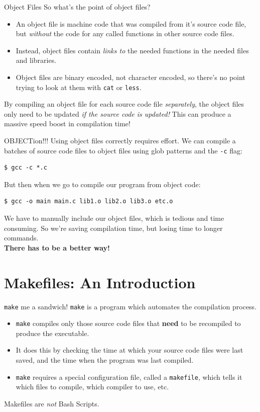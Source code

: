 \documentclass[11pt]{beamer}
\begin{document}
\begin{frame}{Object Files}
So what's the point of object files? 
\begin{itemize}
\item An object file is machine code that was compiled from it's source code file, but \emph{without} the code for any called functions in other source code files. 
\item Instead, object files contain \emph{links to} the needed functions in the needed files and libraries.   
\item Object files are binary encoded, not character encoded, so there's no point trying to look at them with \texttt{cat} or \texttt{less}.  
\end{itemize}
By compiling an object file for each source code file \emph{separately}, the object files only need to be updated \emph{if the source code is updated!}  This can produce a massive speed boost in compilation time!  \\
\end{frame}

\begin{frame}[fragile=singleslide]{OBJECTion!!!}
Using object files correctly requires effort.  We can compile a batches of source code files to object files using glob patterns and the \texttt{-c} flag:
\begin{lstlisting}[style=terminal]
$ gcc -c *.c
\end{lstlisting}
But then when we go to compile our program from object code:
\begin{lstlisting}[style=terminal]
$ gcc -o main main.c lib1.o lib2.o lib3.o etc.o 
\end{lstlisting}
We have to manually include our object files, which is tedious and time consuming. So we're saving compilation time, but losing time to longer commands.\\ 
\vspace{1em}
\center
\textbf{There has to be a better way!} \\
\end{frame}

\section[Makefiles]{Makefiles: An Introduction}
\begin{frame}{\texttt{make} me a sandwich!}
\texttt{make} is a program which automates the compilation process.
\begin{itemize}
\item \texttt{make} compiles only those source code files that \textbf{need} to be recompiled to produce the executable.
\item It does this by checking the time at which your source code files were last saved, and the time when the program was last compiled.
\item \texttt{make} requires a special configuration file, called a \texttt{makefile}, which tells it which files to compile, which compiler to use, etc.
\end{itemize}
\vspace{1em}
\center
Makefiles are \emph{not} Bash Scripts.  
\end{frame}
\end{document}
